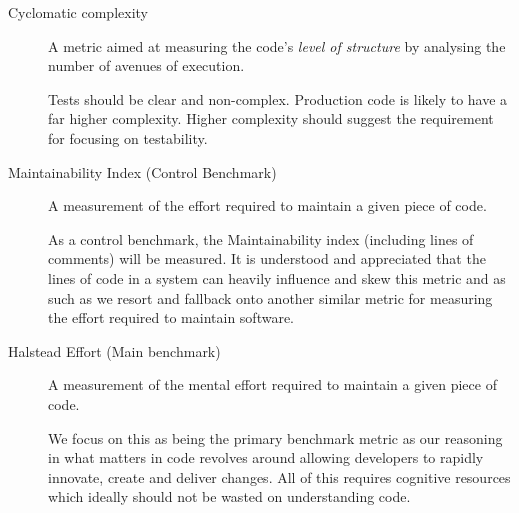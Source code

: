 \begin{description}
	\item [Cyclomatic complexity] A metric aimed at measuring the code's \textit{level of structure} by analysing the number of avenues of execution. 
	
	Tests should be clear and non-complex. Production code is likely to have a far higher complexity. Higher complexity should suggest the requirement for focusing on testability.
	
	\item [Maintainability Index (Control Benchmark)] A measurement of the effort required to maintain a given piece of code. 
	
	As a control benchmark, the Maintainability index (including lines of comments) will be measured. It is understood and appreciated that the lines of code in a system can heavily influence and skew this metric and as such as we resort and fallback onto another similar metric for measuring the effort required to maintain software.
	
	\item[Halstead Effort (Main benchmark)] A measurement of the mental effort required to maintain a given piece of code.
	
	We focus on this as being the primary benchmark metric as our reasoning in what matters in code revolves around allowing developers to rapidly innovate, create and deliver changes. All of this requires cognitive resources which ideally should not be wasted on understanding code.
\end{description}